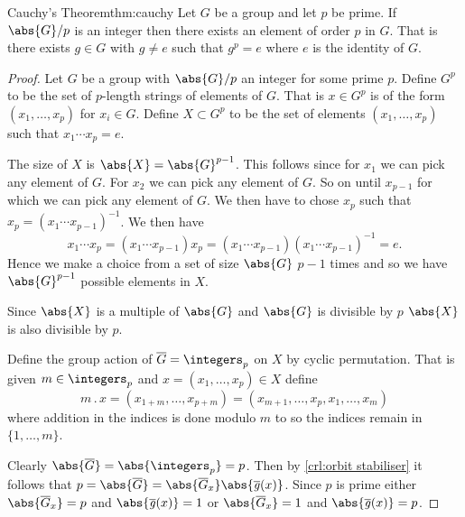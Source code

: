 \documentclass[fleqn]{NotesClass}
\newcommand*{\action}{\mathbin{.}}
\newcommand{\orbit}{\mathit{g}}
\begin{document}
    \begin{thm}{Cauchy's Theorem}{thm:cauchy}
        Let \(G\) be a group and let \(p\) be prime.
        If \(\abs{G}/p\) is an integer then there exists an element of order \(p\) in \(G\).
        That is there exists \(g \in G\)  with \(g \ne e\) such that \(g^p = e\) where \(e\) is the identity of \(G\).
        
        \begin{proof}
            Let \(G\) be a group with \(\abs{G}/p\) an integer for some prime \(p\).
            Define \(G^p\) to be the set of \(p\)-length strings of elements of \(G\).
            That is \(x \in G^p\) is of the form \((x_1, \dotsc, x_p)\) for \(x_i \in G\).
            Define \(X \subset G^p\) to be the set of elements \((x_1, \dotsc, x_p)\) such that \(x_1 \dotsm x_p = e\).
            
            The size of \(X\) is \(\abs{X} = \abs{G}^{p-1}\).
            This follows since for \(x_1\) we can pick any element of \(G\).
            For \(x_2\) we can pick any element of \(G\).
            So on until \(x_{p-1}\) for which we can pick any element of \(G\).
            We then have to chose \(x_p\) such that \(x_p = (x_1 \dotsm x_{p-1})^{-1}\).
            We then have
            \begin{equation}
                x_1 \dotsm x_p = (x_1 \dotsm x_{p-1})x_p = (x_1 \dotsm x_{p-1})(x_1 \dotsm x_{p-1})^{-1} = e.
            \end{equation}
            Hence we make a choice from a set of size \(\abs{G}\) \(p-1\) times and so we have \(\abs{G}^{p-1}\) possible elements in \(X\).
            
            Since \(\abs{X}\) is a multiple of \(\abs{G}\) and \(\abs{G}\) is divisible by \(p\) \(\abs{X}\) is also divisible by \(p\).
            
            Define the group action of \(\overline{G} = \integers_p\) on \(X\) by cyclic permutation.
            That is given \(m \in \integers_p\) and \(x = (x_1, \dotsc, x_p) \in X\) define
            \begin{equation}
                m\action x = (x_{1 + m}, \dotsc, x_{p + m}) = (x_{m+1}, \dotsc, x_p, x_1, \dotsc, x_m)
            \end{equation}
            where addition in the indices is done modulo \(m\) to so the indices remain in \(\{1, \dotsc, m\}\).
            
            Clearly \(\abs{\overline{G}} = \abs{\integers_p} = p\).
            Then by \cref{crl:orbit stabiliser} it follows that \(p =\abs{\overline{G}} = \abs{\overline{G}_x}\abs{\overline{\orbit}(x)}\).
            Since \(p\) is prime either \(\abs{\overline{G}_x} = p\) and \(\abs{\overline{\orbit}(x)} = 1\) or \(\abs{\overline{G}_x} = 1\) and \(\abs{\overline{\orbit}(x)} = p\).
            

\end{proof}
\end{thm}
\end{document}
